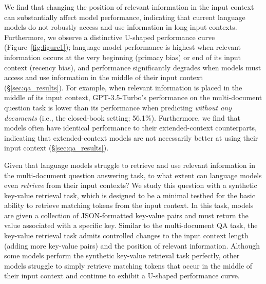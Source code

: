 \documentclass[11pt,a4paper]{article}
\newcommand{\gptturbo}[0]{GPT-3.5-Turbo\xspace}
\begin{document}
We find that changing the position of relevant information in the input context can substantially affect model performance, indicating that current language models do not robustly access and use information in long input contexts.
Furthermore, we observe a distinctive U-shaped performance curve (Figure~\ref{fig:figure1}); language model performance is highest when relevant information occurs at the very beginning (primacy bias) or end of its input context (recency bias), and performance significantly degrades when models must access and use information in the middle of their input context (\S\ref{sec:qa_results}).
For example, when relevant information is placed in the middle of its input context, \gptturbo's performance on the multi-document question task is lower than its performance when predicting \emph{without any documents} (i.e., the closed-book setting; 56.1\%).
Furthermore, we find that models often have identical performance to their extended-context counterparts, indicating that extended-context models are not necessarily better at using their input context (\S\ref{sec:qa_results}).

Given that language models struggle to retrieve and use relevant information in the multi-document question answering task, to what extent can language models even \emph{retrieve} from their input contexts? We study this question with a synthetic key-value retrieval task, which is designed to be a minimal testbed for the basic ability to retrieve matching tokens from the input context. In this task, models are given a collection of JSON-formatted key-value pairs and must return the value associated with a specific key. Similar to the multi-document QA task, the key-value retrieval task admits controlled changes to the input context length (adding more key-value pairs) and the position of relevant information.
Although some models perform the synthetic key-value retrieval task perfectly, other models struggle to simply retrieve matching tokens that occur in the middle of their input context and continue to exhibit a U-shaped performance curve.
\end{document}
